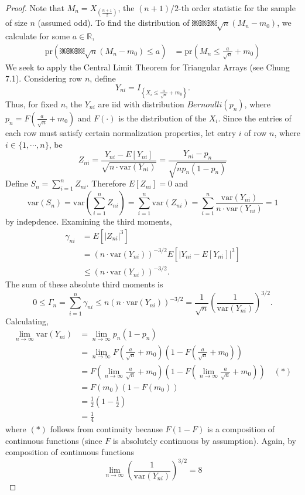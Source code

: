 \documentclass[letterpaper, 12pt]{article}
\newcommand{\pr}{\text{pr}}
\newcommand{\R}{\mathbb{R}}
\newcommand{\var}{\text{var}}
\newcommand{\sion}{\sum_{i=1}^n}
\begin{document}
\begin{proof}
Note that $M_n = X_{(\frac{n+1}{2})}$, the $(n+1)/2$-th order statistic for the sample of size $n$ (assumed odd). To find the distribution of ￼￼￼$\sqrt{n}(M_n - m_0)$, we calculate for some $a \in \R$,
\begin{align*}
\pr(￼￼￼\sqrt{n}(M_n - m_0) \leq a)
&=
\pr\left(M_n \leq  \frac{a}{\sqrt{n}} + m_0\right)
\end{align*}
We seek to apply the Central Limit Theorem for Triangular Arrays (see Chung 7.1). Considering row $n$, define 
\[
Y_{ni} = I_{\left\{X_i \leq \frac{a}{\sqrt{n}} + m_0\right\}}.
\] 
Thus, for fixed $n$, the $Y_{ni}$ are iid with distribution $Bernoulli(p_n)$, where $p_n =F(\frac{a}{\sqrt{n}} + m_0)$ and $F(\cdot)$ is the distribution of the $X_i$. Since the entries of each row must satisfy certain normalization properties, let entry $i$ of row $n$, where $i \in \{1, \cdots, n\}$, be
\[
Z_{ni} = \frac{Y_{ni} - E[Y_{ni}]}{\sqrt{n\cdot\var(Y_{ni})}} = \frac{Y_{ni} - p_n}{\sqrt{np_n(1-p_n)}}
\]
Define $S_n = \sion Z_{ni}$. Therefore $E[Z_{ni}] = 0$ and 
\[
\var(S_n) = \var\left(\sion Z_{ni}\right) = \sion \var(Z_{ni}) =
\sion \frac{\var(Y_{ni})}{n\cdot\var(Y_{ni})} = 1
\]
by indepdence. Examining the third moments,
\begin{align*}
\gamma_{ni} &= E[|Z_{ni}|^3] \\
&= (n\cdot \var(Y_{ni}))^{-3/2} E[|Y_{ni} - E[Y_{ni}]|^3]
\\
&\leq
(n\cdot \var(Y_{ni}))^{-3/2}.
\end{align*}
The sum of these absolute third moments is
\[
0 \leq
\Gamma_n = \sion \gamma_{ni} \leq n (n\cdot \var(Y_{ni}))^{-3/2} 
= \frac{1}{\sqrt{n}} \left( \frac{1}{\var(Y_{ni})} \right)^{3/2}.
\]
Calculating,
\begin{align*}
\lim_{n \to \infty} \var(Y_{ni}) &= \lim_{n \to \infty} p_n (1- p_n) \\
&= \lim_{n \to \infty}
F
\left(\frac{a}{\sqrt{n}} + m_0\right)\left(1 - F\left(\frac{a}{\sqrt{n}} + m_0\right)\right)
\\ 
&= F\left(\lim_{n \to \infty} \frac{a}{\sqrt{n}} + m_0\right)\left(1 -F\left(\lim_{n \to \infty} \frac{a}{\sqrt{n}} + m_0\right) \right)
\quad (*)
\\
&=
F(m_0)(1-F(m_0))\\
&= \frac{1}{2} \left(1 - \frac{1}{2}\right) \\
&= \frac{1}{4}
\end{align*}
where $(*)$ follows from continuity because $F(1-F)$ is a composition of continuous functions (since $F$ is absolutely continuous by assumption). Again, by composition of continuous functions
\[
\lim_{n\to\infty} 
\left( \frac{1}{\var(Y_{ni})} \right)^{3/2}
=
8
\]


\end{proof}
\end{document}
